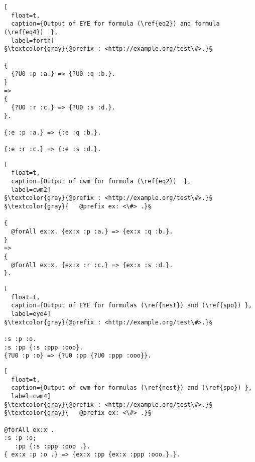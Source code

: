 


\begin{lstlisting}[
  float=t,
  caption={Output of EYE for formula (\ref{eq2}) and formula (\ref{eq4})  },
  label=forth]  
§\textcolor{gray}{@prefix : <http://example.org/test\#>.}§

{
  {?U0 :p :a.} => {?U0 :q :b.}.
}
=> 
{
  {?U0 :r :c.} => {?U0 :s :d.}.
}.

{:e :p :a.} => {:e :q :b.}.

{:e :r :c.} => {:e :s :d.}.

\end{lstlisting}

\begin{lstlisting}[
  float=t,
  caption={Output of cwm for formula (\ref{eq2})  },
  label=cwm2]  
§\textcolor{gray}{@prefix : <http://example.org/test\#>.}§
§\textcolor{gray}{   @prefix ex: <\#> .}§

{
  @forAll ex:x. {ex:x :p :a.} => {ex:x :q :b.}.
}     
=> 
{ 
  @forAll ex:x. {ex:x :r :c.} => {ex:x :s :d.}.
}.
\end{lstlisting}



\begin{lstlisting}[
  float=t,
  caption={Output of EYE for formulas (\ref{nest}) and (\ref{spo}) },
  label=eye4]  
§\textcolor{gray}{@prefix : <http://example.org/test\#>.}§

:s :p :o.
:s :pp {:s :ppp :ooo}.
{?U0 :p :o} => {?U0 :pp {?U0 :ppp :ooo}}.

\end{lstlisting}

\begin{lstlisting}[
  float=t,
  caption={Output of cwm for formulas (\ref{nest}) and (\ref{spo}) },
  label=cwm4]  
§\textcolor{gray}{@prefix : <http://example.org/test\#>.}§
§\textcolor{gray}{   @prefix ex: <\#> .}§

@forAll ex:x .   
:s :p :o;
   :pp {:s :ppp :ooo .}.
{ ex:x :p :o .} => {ex:x :pp {ex:x :ppp :ooo.}.}.
\end{lstlisting}




